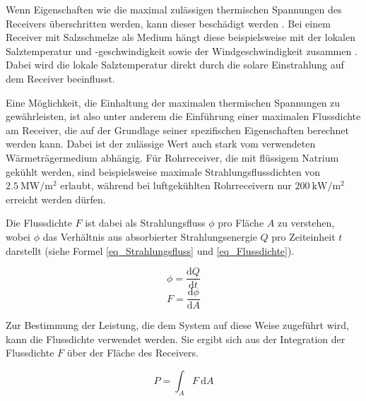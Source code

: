 Wenn Eigenschaften wie die maximal zulässigen thermischen Spannungen des Receivers überschritten werden, kann dieser beschädigt werden \cite{AlbertoSanchez}.
Bei einem Receiver mit Salzschmelze als Medium hängt diese beispielsweise mit der lokalen Salztemperatur und -geschwindigkeit sowie der Windgeschwindigkeit zusammen \cite{VantHull}.
Dabei wird die lokale Salztemperatur direkt durch die solare Einstrahlung auf dem Receiver beeinflusst.

Eine Möglichkeit, die Einhaltung der maximalen thermischen Spannungen zu gewährleisten, ist also unter anderem die Einführung einer maximalen Flussdichte am Receiver, die auf der Grundlage seiner spezifischen Eigenschaften berechnet werden kann.
Dabei ist der zulässige Wert auch stark vom verwendeten Wärmeträgermedium abhängig.
Für Rohrreceiver, die mit flüssigem Natrium gekühlt werden, sind beispielsweise maximale Strahlungsflussdichten von $\SI{2.5}{\mega\watt\per\square\metre}$ erlaubt, während bei luftgekühlten Rohrreceivern nur $\SI{200}{\kilo\watt\per\square\meter}$ \cite[S.17]{DissBelhomme} erreicht werden dürfen.

Die Flussdichte $F$ ist dabei als Strahlungsfluss $\phi$ pro Fläche $A$ zu verstehen, wobei $\phi$ das Verhältnis aus absorbierter Strahlungsenergie $Q$ pro Zeiteinheit $t$ darstellt (siehe Formel \ref{eq_Strahlungsfluss} und \ref{eq_Flussdichte}).

\begin{equation} \label{eq_Strahlungsfluss}
    \phi = \frac{\text{d}Q}{\text{d} t}
\end{equation}
\vspace*{-\baselineskip}
\begin{equation} \label{eq_Flussdichte}
    F = \frac{\text{d}\phi}{\text{d} A}
\end{equation}

Zur Bestimmung der Leistung, die dem System auf diese Weise zugeführt wird, kann die Flussdichte verwendet werden.
Sie ergibt sich aus der Integration der Flussdichte $F$ über der Fläche des Receivers.

\begin{equation} \label{eq_LeistungReceiver}
    P = \int_{A}F~\text{d} A
\end{equation}


